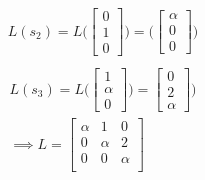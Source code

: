 \documentclass[letterpaper,12pt]{article}
\theoremstyle{definition}
\begin{document}
\begin{align*}
    L(s_2) = L \Big(
    \begin{bmatrix}
        0\\
        1\\
        0
    \end{bmatrix}\Big)
    = \Big(
    \begin{bmatrix}
        \alpha\\0\\0
    \end{bmatrix}\Big)\\
\end{align*}
\begin{align*}
    L(s_3) =L \Big(
    \begin{bmatrix}
        1\\ 
        \alpha\\
        0
    \end{bmatrix}\Big)
    = 
    \begin{bmatrix}
        0\\2\\ \alpha
    \end{bmatrix}\Big)\\
    \implies
    L = 
    \begin{bmatrix}
        \alpha & 1 & 0 \\
        0 & \alpha & 2 \\
        0 & 0 & \alpha \\
    \end{bmatrix}
\end{align*}
\end{document}
